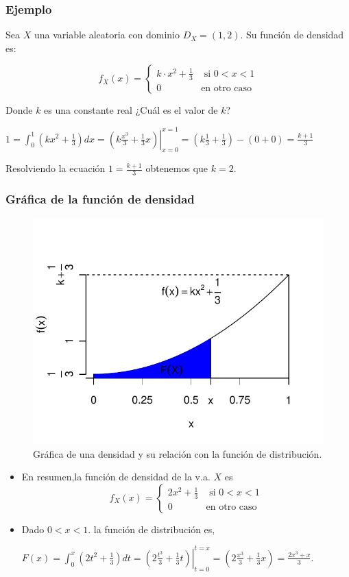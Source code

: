 \begin{frame}
\frametitle{Ejemplo}

Sea $X$ una variable aleatoria con dominio $D_X=(1,2)$. Su función de densidad es:

$$f_X(x)=\left\{\begin{array}{ll}
k\cdot x^2+\frac{1}{3} & \mbox{ si } 0<x<1\\
0 & \mbox{en otro caso}
\end{array}\right.$$

Donde $k$ es una constante real ¿Cuál es el valor de $k$?

$1=\int_{0}^1 (k x^2+\frac{1}{3}) dx= \left.\left(k\frac{x^3}{3}+\frac{1}{3}x\right)\right|_{x=0}^{x=1}=
\left(k\frac{1}{3}+\frac{1}{3}\right)-(0+0)=\frac{k+1}{3}$

Resolviendo la ecuación  $1=\frac{k+1}{3}$ obtenemos que $k=2$.
\end{frame}

\begin{frame}
\frametitle{Gráfica de la función de densidad}
\begin{figure}
\includegraphics{./dibujos/02/-007}
\caption{Gráfica de una densidad y su  relación con la función de distribución.}
\end{figure}
\end{frame}

\begin{frame}
\begin{itemize}
\item En resumen,la función de densidad de la v.a. $X$ es 
$$f_X(x)=\left\{\begin{array}{ll}
2 x^2+\frac{1}{3} & \mbox{ si } 0<x<1\\
0 & \mbox{en otro caso}
\end{array}\right.$$
\item Dado $0<x<1$. la función de distribución es,

$F(x)=\int_{0}^x (2 t^2+\frac{1}{3}) dt =  \left.\left(2\frac{t^3}{3}+\frac{1}{3}t\right)\right|_{t=0}^{t=x}=
\left(2\frac{x^3}{3}+\frac{1}{3}x\right)=\frac{2 x^3+x}{3}.$
\end{itemize}
\end{frame}

